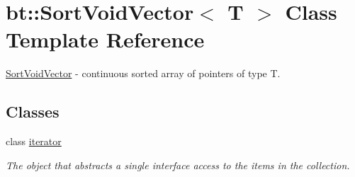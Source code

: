 \hypertarget{classbt_1_1_sort_void_vector}{\section{bt\-:\-:Sort\-Void\-Vector$<$ T $>$ Class Template Reference}
\label{classbt_1_1_sort_void_vector}
}


\hyperlink{classbt_1_1_sort_void_vector}{Sort\-Void\-Vector} -\/ continuous sorted array of pointers of type T.  


\subsection*{Classes}
\begin{DoxyCompactItemize}
\item 
class \hyperlink{classbt_1_1_sort_void_vector_1_1iterator}{iterator}
\begin{DoxyCompactList}\small\item\em The object that abstracts a single interface access to the items in the collection. \end{DoxyCompactList}\end{DoxyCompactItemize}
